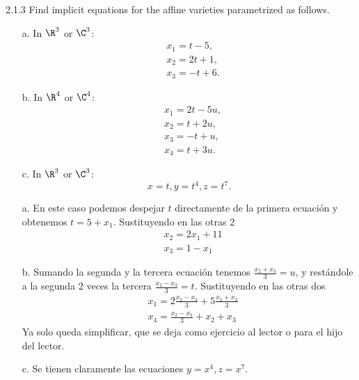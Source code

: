 \documentclass[twoside]{article}
\begin{document}
\newpage

\begin{ejercicio}{2.1.3}
Find implicit equations for the affine varieties parametrized as follows.
\begin{itemize}
\item[a.] In $\R^3$ or $\C^3$:
\begin{align*}
&x_1 = t − 5,\\
&x_2 = 2t + 1,\\
&x_3 = −t + 6.
\end{align*}
\item[b.] In $\R^4$ or $\C^4$:
\begin{align*}
&x_1 = 2t − 5u,\\
&x_2 = t + 2u,\\
&x_3 = −t + u,\\
&x_4 = t + 3u.
\end{align*}
\item[c.] In $\R^3$ or $\C^3$:
\[
x = t, y = t^4, z = t^7.
\]
\end{itemize}
\end{ejercicio}
\begin{solucion}
\begin{itemize}
\item[]
\item[a.] En este caso podemos despejar $t$ directamente de la primera ecuación y obtenemos $t=5+x_1$. Sustituyendo en las otras 2
\begin{align*}
&x_2=2x_1+11\\
&x_3=1-x_1
\end{align*} 
\item[b.] Sumando la segunda y la tercera ecuación tenemos $\frac{x_2+x_3}{3}=u$, y restándole a la segunda 2 veces la tercera $\frac{x_2-x_3}{3}=t$. Sustituyendo en las otras dos
\begin{align*}
&x_1=2\frac{x_2-x_3}{3}+5\frac{x_2+x_3}{3}\\
&x_4=\frac{x_2-x_3}{3}+x_2+x_3
\end{align*}
Ya solo queda simplificar, que se deja como ejercicio al lector o para el hijo del lector. 
\item[c.] Se tienen claramente las ecuaciones $y=x^4, z=x^7$. 
\end{itemize}
\end{solucion}

\newpage
\end{document}
